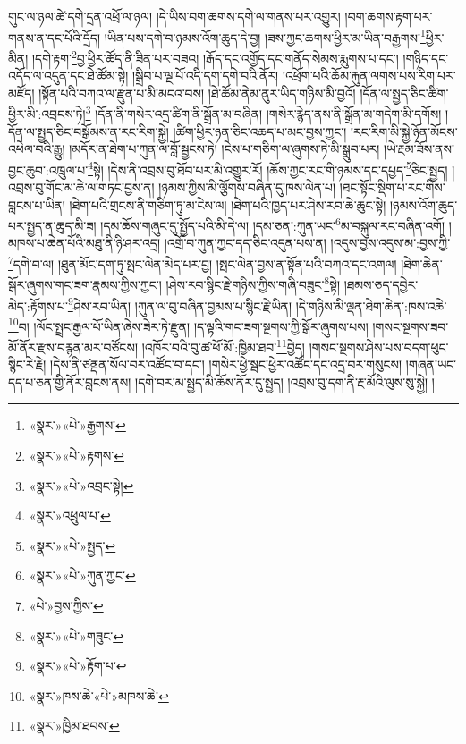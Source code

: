 གུང་ལ་ཉལ་ཚེ་དགེ་དྲན་འཕྲོ་ལ་ཉལ། །དེ་ཡིས་བག་ཆགས་དགེ་ལ་གནས་པར་འགྱུར། །བག་ཆགས་རྟག་པར་གནས་ན་དང་པོའི་དྲོད། །ཡིན་པས་དགེ་བ་ཉམས་འོག་ཆུད་དེ་བྱ། །ཟས་ཀྱང་ཆགས་ཕྱིར་མ་ཡིན་བརྒྱགས་\footnote{«སྣར་»«པེ་»རྒྱགས་}ཕྱིར་མིན། །དགེ་རྟག་\footnote{«སྣར་»«པེ་»རྟགས་}བྱ་ཕྱིར་ཚོད་ནི་ཟིན་པར་བཟའ། །རྒོད་དང་འགྱོད་དང་གནོད་སེམས་རྨུགས་པ་དང་། །གཉིད་དང་འདོད་ལ་འདུན་དང་ཐེ་ཚོམ་སྟེ། །སྒྲིབ་པ་ལྔ་པོ་འདི་དག་དགེ་བའི་ནོར། །འཕྲོག་པའི་ཆོམ་རྐུན་ལགས་པས་རིག་པར་མཛོད། །སྟོན་པའི་བཀའ་ལ་རྫུན་པ་མི་མངའ་བས། །ཐེ་ཚོམ་ནེམ་ནུར་ཡིད་གཉིས་མི་བྱའོ། །དོན་ལ་སྤྱད་ཅིང་ཚིག་ཕྱིར་མི་:འབྲངས་ཏེ།\footnote{«སྣར་»«པེ་»འབྲང་སྟེ།} །དོན་ནི་གསེར་འདྲ་ཚིག་ནི་སྒྲོན་མ་བཞིན། །གསེར་རྙེད་ནས་ནི་སྒྲོན་མ་གདེག་མི་དགོས། །དོན་ལ་སྤྱད་ཅིང་བསྒོམས་ན་རང་རིག་སྐྱེ། །ཚིག་ཕྱིར་ཉན་ཅིང་འཆད་པ་མང་བྱས་ཀྱང་། །རང་རིག་མི་སྐྱེ་ཉོན་མོངས་འཕེལ་བའི་རྒྱུ། །མདོར་ན་ཐེག་པ་ཀུན་ལ་བློ་སྦྱངས་ཏེ། །ངེས་པ་གཅིག་ལ་ཞུགས་ཏེ་མི་སྒྲུབ་པར། །ཡེ་རྔམ་ཟོས་ནས་བྱང་ཆུབ་:འཁྲུལ་པ་\footnote{«སྣར་»འཕྲུལ་པ་}སྟེ། །དེས་ནི་འབྲས་བུ་ཐོབ་པར་མི་འགྱུར་རོ། །ཆོས་ཀྱང་རང་གི་ཉམས་དང་དཔྱད་\footnote{«སྣར་»«པེ་»སྤྱད་}ཅིང་སྤྱད། །འབྲས་བུ་གོང་མ་ཆེ་ལ་གཏང་བྱས་ན། །ཉམས་ཀྱིས་མི་ལྕོགས་བཞིན་དུ་ཁས་ལེན་པ། །ཐང་སྟོང་སྡིག་པ་རང་གིས་བླངས་པ་ཡིན། །ཐེག་པའི་གྲངས་ནི་གཅིག་ཏུ་མ་ངེས་ལ། །ཐེག་པའི་ཁྱད་པར་ཤེས་རབ་ཆེ་ཆུང་སྟེ། །ཉམས་འོག་ཆུད་པར་སྤྱད་ན་ཆུད་མི་ཟ། །དམ་ཆོས་གཞུང་དུ་སྤྱོད་པའི་མི་དེ་ལ། །དམ་ཅན་:ཀུན་ཡང་\footnote{«སྣར་»«པེ་»ཀུན་ཀྱང་}མ་བསྐུལ་རང་བཞིན་འགོ། །མཁས་པ་ཆེན་པོའི་མཐུ་ནི་ཉི་ཤར་འདྲ། །འགྲོ་བ་ཀུན་ཀྱང་དད་ཅིང་འདུན་པས་ན། །འདུས་བྱས་འདུས་མ་:བྱས་ཀྱི་\footnote{«པེ་»བྱས་ཀྱིས་}དགེ་བ་ལ། །ཐུན་མོང་དག་ཏུ་སྤང་ལེན་མེད་པར་བྱ། །སྤང་ལེན་བྱས་ན་སྟོན་པའི་བཀའ་དང་འགལ། །ཐེག་ཆེན་སྒོར་ཞུགས་གང་ཟག་རྣམས་ཀྱིས་ཀྱང་། །ཤེས་རབ་སྙིང་རྗེ་གཉིས་ཀྱིས་གཞི་བཟུང་\footnote{«སྣར་»«པེ་»གཟུང་}སྟེ། །ཐམས་ཅད་དབྱེར་མེད་:རྟོགས་པ་\footnote{«སྣར་»«པེ་»རྟོག་པ་}ཤེས་རབ་ཡིན། །ཀུན་ལ་བུ་བཞིན་བྱམས་པ་སྙིང་རྗེ་ཡིན། །དེ་གཉིས་མི་ལྡན་ཐེག་ཆེན་:ཁས་འཆེ་\footnote{«སྣར་»ཁས་ཆེ་«པེ་»མཁས་ཆེ་}བ། །ལོང་སྤྲང་རྒྱལ་པོ་ཡིན་ཞེས་ཟེར་ཏེ་རྫུན། །ད་ལྟའི་གང་ཟག་སྔགས་ཀྱི་སྒོར་ཞུགས་པས། །གསང་སྔགས་ཟབ་མོ་ནོར་རྫས་བརྙན་མར་བཙོངས། །འཁོར་བའི་བུ་ཚ་ཕོ་མོ་:ཁྱིམ་ཐབ་\footnote{«སྣར་»ཁྱིམ་ཐབས་}བྱེད། །གསང་སྔགས་ཤེས་པས་བདག་ཕུང་སྙིང་རེ་རྗེ། །དེས་ནི་ཙནྡན་སོལ་བར་འཚོང་བ་དང་། །གསེར་ཕྱེ་སྦང་ཕྱེར་འཚོང་དང་འདྲ་བར་གསུངས། །གཞན་ཡང་དད་པ་ཅན་གྱི་ནོར་བླངས་ནས། །དགེ་བར་མ་སྤྱད་མི་ཆོས་ནོར་དུ་སྤྱད། །འབྲས་བུ་དག་ནི་རྔ་མོའི་ལུས་སུ་སྐྱེ། །
